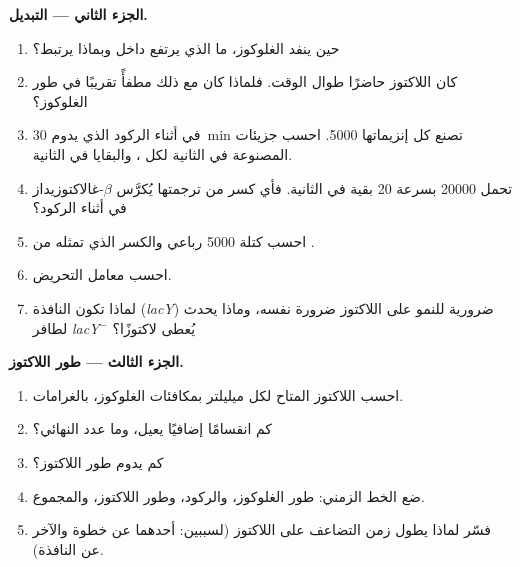 \begin{problem}
\medskip
\noindent\textbf{الجزء الثاني --- التبديل.}
\begin{enumerate}[resume]
  \item حين ينفد الغلوكوز، ما الذي يرتفع داخل  وبماذا
        يرتبط؟
  \item كان اللاكتوز حاضرًا طوال الوقت. فلماذا كان  مع
        ذلك مطفأً تقريبًا في طور الغلوكوز؟
  \item في أثناء الركود الذي يدوم \qty{30}{min} تصنع كل 
        إنزيماتها \num{5000}. احسب جزيئات  المصنوعة في
        الثانية لكل ، والبقايا في الثانية.
  \item تحمل  \num{20000}  بسرعة \qty{20}{} بقية في
        الثانية. فأي كسر من ترجمتها يُكرَّس  $\beta$-غالاكتوزيداز
        في أثناء الركود؟
  \item احسب كتلة \num{5000} رباعي والكسر الذي تمثله من 
        .
  \item احسب معامل التحريض.
  \item لماذا تكون النافذة (\emph{lacY}) ضرورية للنمو على
        اللاكتوز ضرورة  نفسه، وماذا يحدث لطافر
        \emph{lacY}$^-$ يُعطى لاكتوزًا؟
\end{enumerate}

\medskip
\noindent\textbf{الجزء الثالث --- طور اللاكتوز.}
\begin{enumerate}[resume]
  \item احسب اللاكتوز المتاح لكل ميليلتر بمكافئات الغلوكوز،
        بالغرامات.
  \item كم انقسامًا إضافيًا يعيل، وما عدد  النهائي؟
  \item كم يدوم طور اللاكتوز؟
  \item ضع الخط الزمني: طور الغلوكوز، والركود، وطور اللاكتوز،
        والمجموع.
  \item فسّر لماذا يطول زمن التضاعف على اللاكتوز (لسببين: أحدهما
        عن خطوة  والآخر عن النافذة).
\end{enumerate}


\end{problem}
